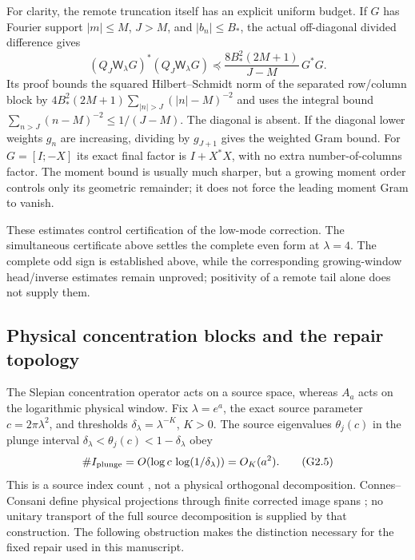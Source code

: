 \documentclass[11pt]{article}
\theoremstyle{remark}
\begin{document}
For clarity, the remote truncation itself has an explicit uniform
budget. If $G$ has Fourier support $|m|\le M$, $J>M$, and
$|b_n|\le B_*$, the actual off-diagonal divided difference gives
\begin{equation}\label{eq:v120-separated-uniform-budget}
 (Q_J\mathsf W_\lambda G)^*(Q_J\mathsf W_\lambda G)
 \preceq\frac{8B_*^2(2M+1)}{J-M}\,G^*G.
\end{equation}
Its proof bounds the squared Hilbert--Schmidt norm of the separated
row/column block by
$4B_*^2(2M+1)\sum_{|n|>J}(|n|-M)^{-2}$ and uses the
integral bound $\sum_{n>J}(n-M)^{-2}\le1/(J-M)$.
The diagonal is absent. If the diagonal lower weights $g_n$ are increasing,
dividing by $g_{J+1}$ gives the weighted Gram bound. For
$G=[I;-X]$ its exact final factor is $I+X^*X$, with no extra
number-of-columns factor. The moment bound is usually much sharper,
but a growing moment order controls only its geometric remainder;
it does not force the leading moment Gram to vanish.

These estimates control certification of the low-mode correction.
The simultaneous certificate above settles the complete even form at
$\lambda=4$. The complete odd sign is established above, while the corresponding
growing-window head/inverse estimates remain unproved; positivity of a remote tail
alone does not supply them.



\subsection*{Physical concentration blocks and the repair topology}
The Slepian concentration operator acts on a source space, whereas
$A_a$ acts on the logarithmic physical window. Fix $\lambda=e^a$,
the exact source parameter $c=2\pi\lambda^2$, and thresholds
$\delta_\lambda=\lambda^{-K}$, $K>0$. The source eigenvalues
$\theta_j(c)$ in the plunge interval
$\delta_\lambda<\theta_j(c)<1-\delta_\lambda$ obey
\[
 \#I_{\rm plunge}
 =O\!\left(\log c\,\log(1/\delta_\lambda)\right)=O_K(a^2).
 \tag{G2.5}
\]
This is a source index count \cite{SlepianTransition}, not a physical
orthogonal decomposition. Connes--Consani define physical projections
through finite corrected image spans \cite{ConnesConsani2023}; no
unitary transport of the full source decomposition is supplied by that
construction. The following obstruction makes the distinction necessary
for the fixed repair used in this manuscript.
\end{document}
